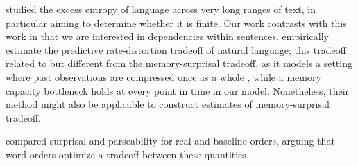 \cite{debowski-excess-2011} studied the excess entropy of language across very long ranges of text, in particular aiming to determine whether it is finite.
Our work contrasts with this work in that we are interested in dependencies within sentences.
\cite{hahn2019estimating} empirically estimate the predictive rate-distortion tradeoff of natural language; this tradeoff related to but different from the memory-surprisal tradeoff, as it models a setting where past observations are compressed once as a whole \citep{marzen-predictive-2016}, while a memory capacity bottleneck holds at every point in time in our model.
Nonetheless, their method might also be applicable to construct estimates of memory-surprisal tradeoff.

 \cite{hahn2020universals} compared surprisal and parseability for real and baseline orders, arguing that word orders optimize a tradeoff between these quantities.








